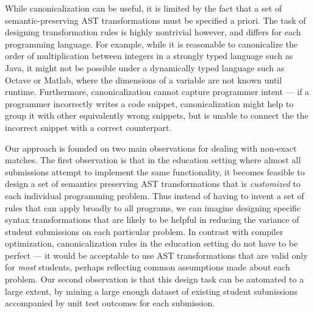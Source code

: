 While canonicalization can be useful, it is limited by the fact that a set of semantic-preserving AST transformations must be 
specified a priori.  The task of designing transformation rules is highly nontrivial however, and differs for each programming language.
For example, while it is reasonable to canonicalize the order of multiplication between integers in a strongly typed language such as Java, 
it might not be possible under a dynamically typed language such as Octave or Matlab, where the dimensions of a variable are not known until runtime.
Furthermore, canonicalization cannot capture programmer intent --- if a programmer incorrectly writes a code snippet, 
canonicalization might help to group it with other equivalently wrong snippets, but is unable to connect the the incorrect snippet with a correct counterpart.

Our approach is founded on two main observations for dealing with non-exact matches.   
The first observation is that in the education setting where almost all submissions attempt to implement the same functionality, 
it becomes feasible to design a set of semantics preserving AST transformations that is \emph{customized} to each individual programming problem.
Thus instead of having to invent a set of rules that can apply broadly to all programs, we can imagine designing specific syntax transformations
that are likely to be helpful in reducing the variance of student submissions on each particular problem.
In contrast with compiler optimization,
canonicalization rules in the education setting do not have to be perfect  ---
it would be acceptable to use AST transformations that are valid only for \emph{most} students, perhaps
reflecting common assumptions made about each problem.
Our second observation is that this design task can be automated to a large extent, by mining a large enough dataset of existing student submissions accompanied
by unit test outcomes for each submission.


